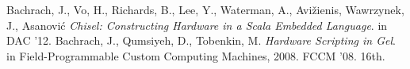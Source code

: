 \documentclass[twocolumn,10pt]{article}
\begin{document}




\begin{thebibliography}{50}
 Bachrach, J., Vo, H., Richards, B., Lee, Y., Waterman,
  A., Avi\v{z}ienis, Wawrzynek, J., Asanovi\'{c} \textsl{Chisel:
    Constructing Hardware in a Scala Embedded Language}.
in DAC '12.
 Bachrach, J., Qumsiyeh, D., Tobenkin, M. \textsl{Hardware Scripting in Gel}.
in Field-Programmable Custom Computing Machines, 2008. FCCM '08. 16th.
\end{thebibliography}
\end{document}
